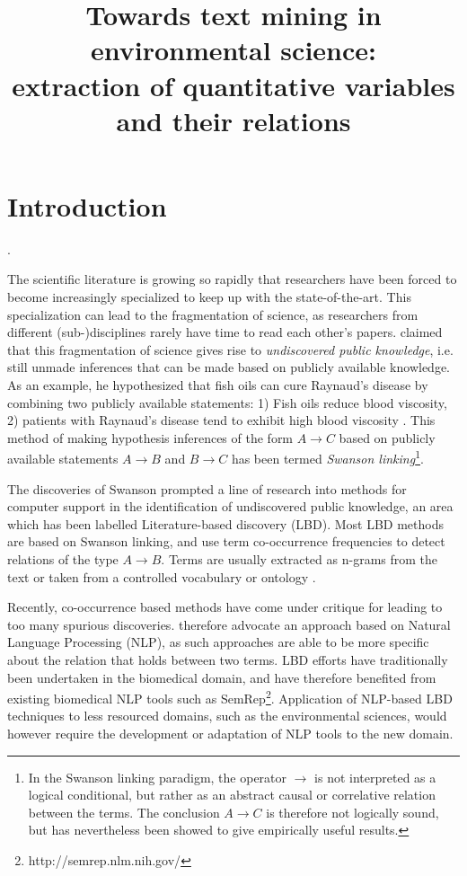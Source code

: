 \documentclass[10pt, a4paper]{article}
\title{Towards text mining in environmental science:\\
extraction of quantitative variables and their relations}
\begin{document}
\maketitleabstract

\section{Introduction}


.

The scientific literature is growing so rapidly that researchers have been forced to become increasingly specialized to keep up with the state-of-the-art. 
This specialization can lead to the fragmentation of science, as researchers from different (sub-)disciplines rarely have time to read each other's papers. 
 claimed that this fragmentation of science gives rise to \emph{undiscovered public knowledge}, i.e. still unmade inferences that can be made based on publicly available knowledge. As an example, he hypothesized that fish oils can cure Raynaud's disease by combining two publicly available statements: 1) Fish oils reduce blood viscosity, 2) patients with Raynaud's disease tend to exhibit high blood viscosity \cite{Swanson1986Fishoil}. 
This method of making hypothesis inferences of the form $A \to C$ based on publicly available statements $A \to B$ and $B \to C$ has been termed \emph{Swanson linking}\footnote{In the Swanson linking paradigm, the operator $\to$ is not interpreted as a logical conditional, but rather as an abstract causal or correlative relation between the terms. The conclusion $A \to C$ is therefore not logically sound, but has nevertheless been showed to give empirically useful results.}. 

The discoveries of Swanson prompted a line of research into methods for computer support in the identification of undiscovered public knowledge, an area which has been labelled Literature-based discovery (LBD). 
Most LBD methods are based on Swanson linking, and use term co-occurrence frequencies to detect relations of the type $A \to B$. 
Terms are usually extracted as n-grams from the text \cite{Lindsay1999LBDLexicalStat} or taken from a controlled vocabulary or ontology \cite{Weeber2001ConceptsInLBD}.

Recently, co-occurrence based methods have come under critique for leading to too many spurious discoveries.
 therefore advocate an approach based on Natural Language Processing (NLP), as such approaches are able to be more specific about the relation that holds between two terms. 
LBD efforts have traditionally been undertaken in the biomedical domain, and have therefore benefited from existing biomedical NLP tools such as SemRep\footnote{http://semrep.nlm.nih.gov/}.
Application of NLP-based LBD techniques to less resourced domains, such as the environmental sciences, would however require the development or adaptation of NLP tools to the new domain.
\end{document}
